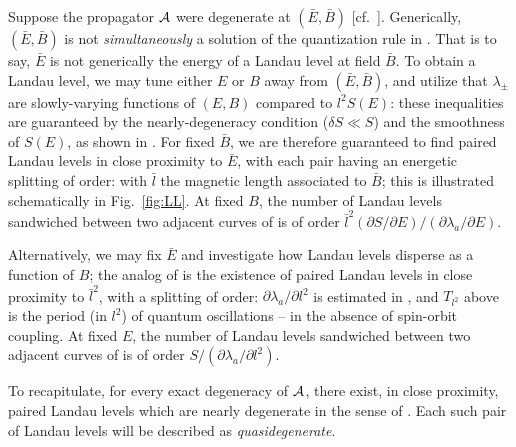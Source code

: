 \documentclass[aps, showpacs, twocolumn, notitlepage, superscriptaddress]{revtex4-1}
\begin{document}
Suppose the propagator ${\cal A}$ were degenerate at $(\bar{E},\bar{B})$ [cf.\ ]. Generically, $(\bar{E},\bar{B})$ is not \emph{simultaneously} a solution of the quantization rule in .  
That is to say, $\bar{E}$ is not generically the energy of a Landau level at field $\bar{B}$. To obtain a Landau level, we may tune either $E$ or $B$   away from $(\bar{E},\bar{B})$, and  utilize that  $\lambda_{\pm}$ are slowly-varying functions of $(E,B)$ compared to $l^2S(E)$:
these inequalities are guaranteed by the nearly-degeneracy condition ($\delta S{\ll}S$) and the smoothness of $S(E)$, as shown in .  For fixed $\bar{B}$, we are therefore guaranteed to find paired Landau levels  in close proximity to $\bar{E}$, with each pair having an energetic splitting of order:
with $\bar{l}$ the magnetic length associated to $\bar{B}$; this is illustrated schematically in Fig.\ \ref{fig:LL}. At fixed $B$, the number of Landau levels sandwiched between two adjacent curves of  is of order $\bar{l}^2(\partial S/\partial E)/(\partial \lambda_a/\partial E).$


Alternatively, we may fix $\bar{E}$ and investigate how Landau levels disperse as a function of $B$; the analog of   is the existence of paired Landau levels in close proximity to $\bar{l}^2$, with a splitting of order:
$\partial \lambda_a/\partial l^2$ is estimated in , and
$T_{l^2}$ above is the period (in $l^2$) of quantum oscillations -- in the absence of spin-orbit coupling. At fixed $E$, the number of Landau levels sandwiched between two adjacent curves of  is of order $S/(\partial \lambda_a/\partial l^2).$

To recapitulate, for every exact degeneracy of ${\cal A}$, there exist, in close proximity, paired Landau levels which are  nearly degenerate in the sense of . Each such pair of Landau levels will be described as \textit{quasidegenerate}. 

\end{document}
